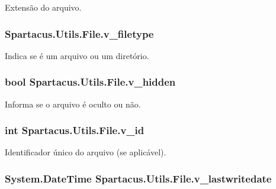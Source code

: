 Extensão do arquivo. 

\hypertarget{classSpartacus_1_1Utils_1_1File_ab7b8ce972a88dde2ffab4ad63c4cc637}{
\subsubsection[{v\+\_\+filetype}]{ Spartacus.\+Utils.\+File.\+v\+\_\+filetype}}\label{classSpartacus_1_1Utils_1_1File_ab7b8ce972a88dde2ffab4ad63c4cc637}


Indica se é um arquivo ou um diretório. 

\hypertarget{classSpartacus_1_1Utils_1_1File_a33edc75ffa7eab828065c54d645372ea}{
\subsubsection[{v\+\_\+hidden}]{\setlength{\rightskip}{0pt plus 5cm}bool Spartacus.\+Utils.\+File.\+v\+\_\+hidden}}\label{classSpartacus_1_1Utils_1_1File_a33edc75ffa7eab828065c54d645372ea}


Informa se o arquivo é oculto ou não. 

\hypertarget{classSpartacus_1_1Utils_1_1File_a17bc6165cc938a4f490025290945a6e3}{
\subsubsection[{v\+\_\+id}]{\setlength{\rightskip}{0pt plus 5cm}int Spartacus.\+Utils.\+File.\+v\+\_\+id}}\label{classSpartacus_1_1Utils_1_1File_a17bc6165cc938a4f490025290945a6e3}


Identificador único do arquivo (se aplicável). 

\hypertarget{classSpartacus_1_1Utils_1_1File_a3ff14b7ecbf2e2b5bb41f44943a18c83}{
\subsubsection[{v\+\_\+lastwritedate}]{\setlength{\rightskip}{0pt plus 5cm}System.\+Date\+Time Spartacus.\+Utils.\+File.\+v\+\_\+lastwritedate}}\label{classSpartacus_1_1Utils_1_1File_a3ff14b7ecbf2e2b5bb41f44943a18c83}


